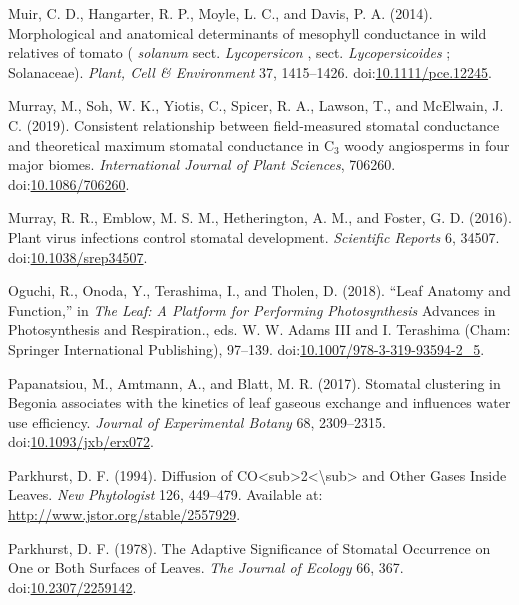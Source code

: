 \documentclass[utf8]{frontiersSCNS}
\newlength{\cslhangindent}
\newenvironment{cslreferences}%
  {\setlength{\parindent}{0pt}%
  \everypar{\setlength{\hangindent}{\cslhangindent}}\ignorespaces}%
  {\par}
\begin{document}
\begin{cslreferences}
\leavevmode\hypertarget{ref-muir_morphological_2014}{}%
Muir, C. D., Hangarter, R. P., Moyle, L. C., and Davis, P. A. (2014).
Morphological and anatomical determinants of mesophyll conductance in
wild relatives of tomato ( \emph{solanum} sect. \emph{Lycopersicon} ,
sect. \emph{Lycopersicoides} ; Solanaceae). \emph{Plant, Cell \&
Environment} 37, 1415--1426.
doi:\href{https://doi.org/10.1111/pce.12245}{10.1111/pce.12245}.

\leavevmode\hypertarget{ref-murray_consistent_2019}{}%
Murray, M., Soh, W. K., Yiotis, C., Spicer, R. A., Lawson, T., and
McElwain, J. C. (2019). Consistent relationship between field-measured
stomatal conductance and theoretical maximum stomatal conductance in
C\(_{\textrm{3}}\) woody angiosperms in four major biomes.
\emph{International Journal of Plant Sciences}, 706260.
doi:\href{https://doi.org/10.1086/706260}{10.1086/706260}.

\leavevmode\hypertarget{ref-murray_plant_2016}{}%
Murray, R. R., Emblow, M. S. M., Hetherington, A. M., and Foster, G. D.
(2016). Plant virus infections control stomatal development.
\emph{Scientific Reports} 6, 34507.
doi:\href{https://doi.org/10.1038/srep34507}{10.1038/srep34507}.

\leavevmode\hypertarget{ref-oguchi_leaf_2018}{}%
Oguchi, R., Onoda, Y., Terashima, I., and Tholen, D. (2018). ``Leaf
Anatomy and Function,'' in \emph{The Leaf: A Platform for Performing
Photosynthesis} Advances in Photosynthesis and Respiration., eds. W. W.
Adams III and I. Terashima (Cham: Springer International Publishing),
97--139.
doi:\href{https://doi.org/10.1007/978-3-319-93594-2_5}{10.1007/978-3-319-93594-2\_5}.

\leavevmode\hypertarget{ref-papanatsiou_stomatal_2017}{}%
Papanatsiou, M., Amtmann, A., and Blatt, M. R. (2017). Stomatal
clustering in Begonia associates with the kinetics of leaf gaseous
exchange and influences water use efficiency. \emph{Journal of
Experimental Botany} 68, 2309--2315.
doi:\href{https://doi.org/10.1093/jxb/erx072}{10.1093/jxb/erx072}.

\leavevmode\hypertarget{ref-parkhurst_diffusion_1994}{}%
Parkhurst, D. F. (1994). Diffusion of
CO\textless sub\textgreater2\textless\textbackslash sub\textgreater{}
and Other Gases Inside Leaves. \emph{New Phytologist} 126, 449--479.
Available at: \url{http://www.jstor.org/stable/2557929}.

\leavevmode\hypertarget{ref-parkhurst_adaptive_1978}{}%
Parkhurst, D. F. (1978). The Adaptive Significance of Stomatal
Occurrence on One or Both Surfaces of Leaves. \emph{The Journal of
Ecology} 66, 367.
doi:\href{https://doi.org/10.2307/2259142}{10.2307/2259142}.


\end{cslreferences}
\end{document}
